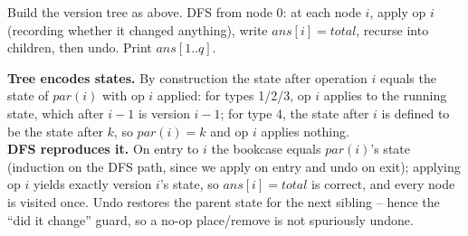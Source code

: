 Build the version tree as above.  DFS from node \(0\): at each node \(i\), apply op \(i\) (recording whether it changed anything), write \(\mathit{ans}[i]=\mathit{total}\), recurse into children, then undo.  Print \(\mathit{ans}[1..q]\).

\begin{proofbox}
\textbf{Tree encodes states.} By construction the state after operation \(i\) equals the state of \(\mathit{par}(i)\) with op \(i\) applied: for types 1/2/3, op \(i\) applies to the running state, which after \(i-1\) is version \(i-1\); for type 4, the state after \(i\) is defined to be the state after \(k\), so \(\mathit{par}(i)=k\) and op \(i\) applies nothing.\\
\textbf{DFS reproduces it.} On entry to \(i\) the bookcase equals \(\mathit{par}(i)\)'s state (induction on the DFS path, since we apply on entry and undo on exit); applying op \(i\) yields exactly version \(i\)'s state, so \(\mathit{ans}[i]=\mathit{total}\) is correct, and every node is visited once.  Undo restores the parent state for the next sibling -- hence the ``did it change'' guard, so a no-op place/remove is not spuriously undone.
\end{proofbox}

